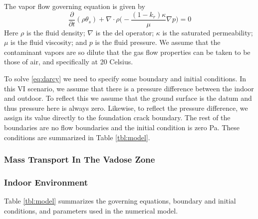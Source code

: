 The vapor flow governing equation is given by
\begin{equation}\label{eq:darcy}
  \frac{\partial}{\partial t} (\rho \theta_s) + \nabla \cdot \rho \Big( -\frac{(1-k_r) \kappa}{\mu} \nabla p \Big) = 0
\end{equation}
Here $\rho$ is the fluid density; $\nabla$ is the del operator; $\kappa$ is the saturated permeability; $\mu$ is the fluid viscosity; and $p$ is the fluid pressure.
We assume that the contaminant vapors are so dilute that the gas flow properties can be taken to be those of air, and specifically at 20 Celsius.\par

To solve \eqref{eq:darcy} we need to specify some boundary and initial conditions.
In this VI scenario, we assume that there is a pressure difference between the indoor and outdoor.
To reflect this we assume that the ground surface is the datum and thus pressure here is always zero.
Likewise, to reflect the pressure difference, we assign its value directly to the foundation crack boundary.
The rest of the boundaries are no flow boundaries and the initial condition is zero Pa.
These conditions are summarized in Table \ref{tbl:model}.\par

\subsubsection{Mass Transport In The Vadose Zone}



\subsubsection{Indoor Environment}




Table \ref{tbl:model} summarizes the governing equations, boundary and initial conditions, and parameters used in the numerical model.
